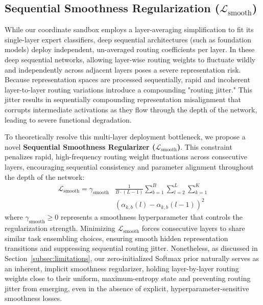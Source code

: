 \subsection{Sequential Smoothness Regularization ($\mathcal{L}_{\text{smooth}}$)}
\label{subsec:smooth_loss}

While our coordinate sandbox employs a layer-averaging simplification to fit its single-layer expert classifiers, deep sequential architectures (such as foundation models) deploy independent, un-averaged routing coefficients per layer. In these deep sequential networks, allowing layer-wise routing weights to fluctuate wildly and independently across adjacent layers poses a severe representation risk. Because representation spaces are processed sequentially, rapid and incoherent layer-to-layer routing variations introduce a compounding "routing jitter." This jitter results in sequentially compounding representation misalignment that corrupts intermediate activations as they flow through the depth of the network, leading to severe functional degradation.

To theoretically resolve this multi-layer deployment bottleneck, we propose a novel \textbf{Sequential Smoothness Regularizer ($\mathcal{L}_{\text{smooth}}$)}. This constraint penalizes rapid, high-frequency routing weight fluctuations across consecutive layers, encouraging sequential consistency and parameter alignment throughout the depth of the network:
\begin{equation}
\begin{split}
    \mathcal{L}_{\text{smooth}} = \gamma_{\text{smooth}} & \frac{1}{B \cdot (L-1)} \sum_{b=1}^B \sum_{l=2}^L \sum_{k=1}^K \\
    & \left( \alpha_{k, b}(l) - \alpha_{k, b}(l-1) \right)^2
\end{split}
\end{equation}
where $\gamma_{\text{smooth}} \ge 0$ represents a smoothness hyperparameter that controls the regularization strength. Minimizing $\mathcal{L}_{\text{smooth}}$ forces consecutive layers to share similar task ensembling choices, ensuring smooth hidden representation transitions and suppressing sequential routing jitter. Nonetheless, as discussed in Section~\ref{subsec:limitations}, our zero-initialized Softmax prior naturally serves as an inherent, implicit smoothness regularizer, holding layer-by-layer routing weights close to their uniform, maximum-entropy state and preventing routing jitter from emerging, even in the absence of explicit, hyperparameter-sensitive smoothness losses.


